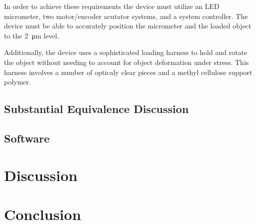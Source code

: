 \documentclass{article}
\begin{document}
In order to achieve these requirements the device must utilize an LED micrometer, two motor/encoder acutator systems, and a system controller. The device must be able to accurately position the micrometer and the loaded object to the \SI{2}{\micro m} level.

Additionally, the device uses a sophisticated loading harness to hold and rotate the object without needing to account for object deformation under stress. This harness involves a number of opticaly clear pieces and a methyl cellulose support polymer.

\subsection{Substantial Equivalence Discussion}





\subsection{Software}




\section{Discussion}
\label{sec:discussion}

\section{Conclusion}
\label{sec:conclusion}


\newpage
{}


\end{document}
